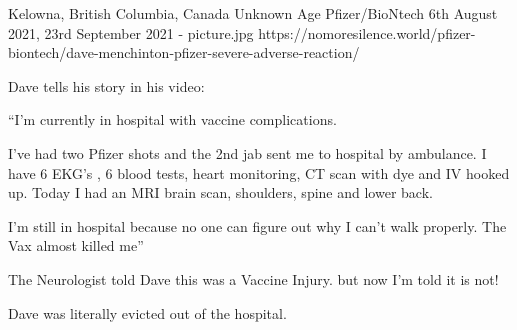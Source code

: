{Kelowna, British Columbia, Canada}
{Unknown Age}
{Pfizer/BioNtech}
{6th August 2021, 23rd September 2021}
{-}
{picture.jpg}
{https://nomoresilence.world/pfizer-biontech/dave-menchinton-pfizer-severe-adverse-reaction/}
{


Dave tells his story in his video:

“I’m currently in hospital with vaccine complications.

I’ve had two Pfizer shots and the 2nd jab sent me to hospital by ambulance. I have 6 EKG’s , 6 blood tests, heart monitoring, CT scan with dye and IV hooked up. Today I had an MRI brain scan, shoulders, spine and lower back.

I’m still in hospital because no one can figure out why I can’t walk properly. The Vax almost killed me”

The Neurologist told Dave this was a Vaccine Injury. but now I’m told it is not!

Dave was literally evicted out of the hospital.
}
